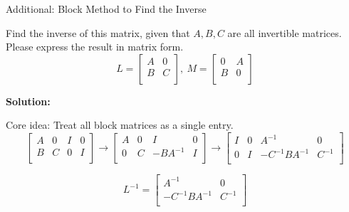 \documentclass{beamer}
\begin{document}
\begin{frame}{Additional: Block Method to Find the Inverse}
\begin{example}
    Find the inverse of this matrix, given that $A,B,C$ are all invertible matrices. Please express the result in matrix form.
    \begin{equation*}
        L=\left[ \begin{matrix}
            A&		0\\
            B&		C\\
        \end{matrix} \right],\:
        M=\left[ \begin{matrix}
            0&		A\\
            B&		0\\
        \end{matrix} \right]
    \end{equation*}
\end{example}

\textbf{Solution:}

Core idea: Treat all block matrices as a single entry.
\begin{equation*}
    \left[ \begin{matrix}
        A&		0&		I&		0\\
        B&		C&		0&		I\\
    \end{matrix} \right] \rightarrow \left[ \begin{matrix}
        A&		0&		I&		0\\
        0&		C&		-BA^{-1}&		I\\
    \end{matrix} \right] \rightarrow \left[ \begin{matrix}
        I&		0&		A^{-1}&		0\\
        0&		I&		-C^{-1}BA^{-1}&		C^{-1}\\
    \end{matrix} \right]
\end{equation*}

\begin{equation*}
    L^{-1}=\left[ \begin{matrix}
        A^{-1}&		0\\
        -C^{-1}BA^{-1}&		C^{-1}\\
    \end{matrix} \right]
\end{equation*}

\end{frame}
\end{document}
